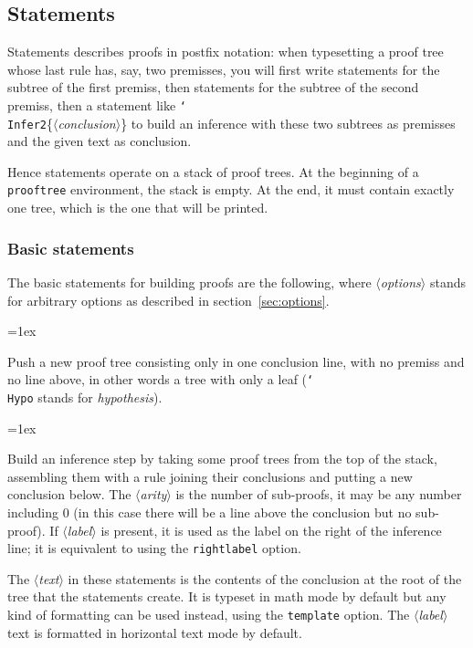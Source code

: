 \documentclass{article}
\newcommand\lit[1]{\texttt{#1}}
\newcommand\cs[1]{\lit{\char`\\#1}}
\newcommand\opt[1]{\lit{#1}}
\newcommand\meta[1]{$\langle$\textit{#1}$\rangle$}
\newcommand\oarg[1]{\lit{[}\meta{#1}\lit{]}}
\newcommand\marg[1]{\lit{\{}\meta{#1}\lit{\}}}
\newenvironment{csdoc}[1]{%
  \smallbreak\noindent{#1}%
  \begin{list}{}{%
    \topsep=1ex%
  }%
  \item
}{%
  \end{list}%
}
\begin{document}
\subsection{Statements}
\label{sec:statements}

Statements describes proofs in postfix notation: when typesetting a proof tree
whose last rule has, say, two premisses, you will first write statements for
the subtree of the first premiss, then statements for the subtree of the
second premiss, then a statement like \cs{Infer2}\{\meta{conclusion}\} to
build an inference with these two subtrees as premisses and the given text as
conclusion.

Hence statements operate on a stack of proof trees.
At the beginning of a \lit{prooftree} environment, the stack is empty.
At the end, it must contain exactly one tree, which is the one that will be
printed.

\subsubsection{Basic statements}

The basic statements for building proofs are the following, where
\meta{options} stands for arbitrary options as described in
section~\ref{sec:options}.
\begin{csdoc}{\cs{Hypo}\oarg{options}\marg{text}}
  Push a new proof tree consisting only in one conclusion line, with no
  premiss and no line above, in other words a tree with only a leaf
  (\cs{Hypo} stands for \emph{hypothesis}).
\end{csdoc}
\begin{csdoc}{\cs{Infer}\oarg{options}\marg{arity}\oarg{label}\marg{text}}
  Build an inference step by taking some proof trees from the top of the
  stack, assembling them with a rule joining their conclusions and putting a
  new conclusion below.
  The \meta{arity} is the number of sub-proofs, it may be any number
  including 0 (in this case there will be a line above the conclusion but no
  sub-proof).
  If \meta{label} is present, it is used as the label on the right of the
  inference line; it is equivalent to using the \opt{rightlabel} option.
\end{csdoc}

The \meta{text} in these statements is the contents of the conclusion at the
root of the tree that the statements create.
It is typeset in math mode by default but any kind of formatting can be used
instead, using the \opt{template} option.
The \meta{label} text is formatted in horizontal text mode by default.
\end{document}

